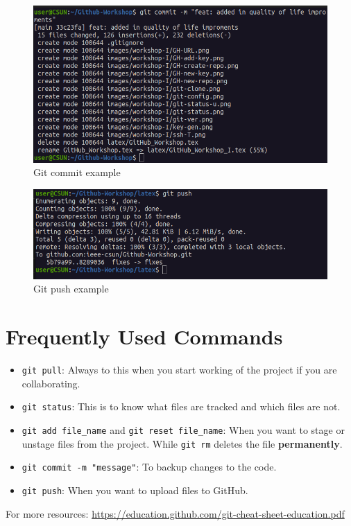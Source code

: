\documentclass[12pt, a4paper]{article}
\begin{document}
\begin{figure}[H]
\centering
\includegraphics[scale=0.5]{../images/workshop-I/git-commit.png}
\caption{Git commit example}
\end{figure}

\begin{figure}[H]
\centering
\includegraphics[scale=0.5]{../images/workshop-I/git-push.png}
\caption{Git push example}
\end{figure}

\section{Frequently Used Commands}
\begin{itemize}
    \item \verb`git pull`: Always to this when you start working of the project if you are collaborating.
    \item \verb`git status`: This is to know what files are tracked and which files are not.
    \item \verb`git add file_name` and \verb`git reset file_name`: When you want to stage or unstage files from the project. While \verb`git rm` deletes the file \textbf{permanently}.
    \item \verb`git commit -m "message"`: To backup changes to the code.
    \item \verb`git push`: When you want to upload files to GitHub.
\end{itemize}
For more resources: \url{https://education.github.com/git-cheat-sheet-education.pdf}
\clearpage
\end{document}
